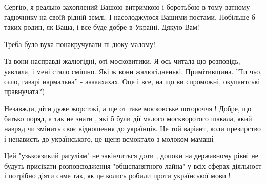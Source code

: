 \begin{cmtfront}

Сергію, я реально захоплений Вашою витримкою і боротьбою в тому ватному
гадючнику на своїй рідній землі. І насолоджуюся Вашими постами. Побільше б
таких родин, як Ваша, і все буде добре в Україні. Дякую Вам!


Треба було вуха понакручувати пі.дюку малому!


Та вони насправді жалюгідні, оті московитики.  Я ось читала цю розповідь,
уявляла, і мені стало смішно.  Які ж вони жалюгідненькі. Примітивщина. ''Ти
чьо, сєло, гаварі нармальна'' - ааааахахах. Оце і все, на що ви спроможні,
окупантські правнучата?)


Незавжди, діти дуже жорстокі, а ще от таке московське потороччя !  Добре, що
батько поряд, а так не знати , які б були дії малого москворотого шакала, який
навряд чи змінить своє відношення до українців.  Це той варіант, коли
презирство і ненависть до українського, це щеня всмоктало з молоком мамаші


Цей "узькоязикий рагулізм" не закінчиться доти , допоки на державному рівні не
будуть присікати розповсюдження "общєпанятного лайна" у всіх сферах діяльност і
потрібно діяти саме так, як це колись робили проти української мови !
	
\end{cmtfront}

